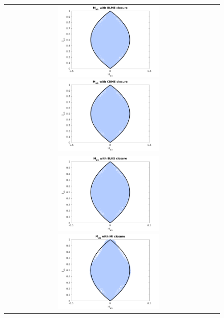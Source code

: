 \begin{figure}
  \centering
  \begin{tabular}{cc}
    \includegraphics[width=0.5\textwidth]{figures/MabWithBLME}
    \includegraphics[width=0.5\textwidth]{figures/MabWithCBME} \\
    \includegraphics[width=0.5\textwidth]{figures/MabWithBLKS}
    \includegraphics[width=0.5\textwidth]{figures/MabWithMI}
  \end{tabular}
  \caption{}
  \label{fig:MabWithDifferentClosure}
\end{figure}

